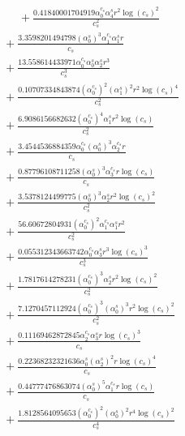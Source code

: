 \documentclass[10pt]{article}
\begin{document}
\begin{align*}
\phantom{R_{0,8}} &\phantom{={}}{}  + \frac{0.41840001704919 \alpha_{0}^{c_s} \alpha_{4}^s r^{2} \log{\left(c_{s} \right)}^{2}}{c_{s}^{2}} \\
&{}  + \frac{3.3598201494798 \left(\alpha_{0}^s\right)^{3} \alpha_{1}^{c_s} \alpha_{1}^s r}{c_{s}} \\
&{}  + \frac{13.558614433971 \alpha_{0}^{c_s} \alpha_{0}^s \alpha_{2}^s r^{3}}{c_{s}^{3}} \\
&{}  + \frac{0.10707334843874 \left(\alpha_{0}^{c_s}\right)^{2} \left(\alpha_{1}^s\right)^{2} r^{2} \log{\left(c_{s} \right)}^{4}}{c_{s}^{2}} \\
&{}  + \frac{6.9086156682632 \left(\alpha_{0}^{c_s}\right)^{4} \alpha_{1}^s r^{2} \log{\left(c_{s} \right)}}{c_{s}^{2}} \\
&{}  + \frac{3.4544536884359 \alpha_{0}^{c_s} \left(\alpha_{0}^s\right)^{3} \alpha_{2}^{c_s} r}{c_{s}} \\
&{}  + \frac{0.87796108711258 \left(\alpha_{0}^s\right)^{3} \alpha_{3}^{c_s} r \log{\left(c_{s} \right)}}{c_{s}} \\
&{}  + \frac{3.5378124499775 \left(\alpha_{0}^s\right)^{3} \alpha_{2}^s r^{2} \log{\left(c_{s} \right)}^{2}}{c_{s}^{2}} \\
&{}  + \frac{56.60672804931 \left(\alpha_{0}^{c_s}\right)^{2} \alpha_{1}^{c_s} \alpha_{1}^s r^{2}}{c_{s}^{2}} \\
&{}  + \frac{0.055312343663742 \alpha_{0}^{c_s} \alpha_{3}^s r^{3} \log{\left(c_{s} \right)}^{3}}{c_{s}^{3}} \\
&{}  + \frac{1.7817614278231 \left(\alpha_{0}^{c_s}\right)^{3} \alpha_{2}^s r^{2} \log{\left(c_{s} \right)}^{2}}{c_{s}^{2}} \\
&{}  + \frac{7.1270457112924 \left(\alpha_{0}^{c_s}\right)^{3} \left(\alpha_{0}^s\right)^{3} r^{2} \log{\left(c_{s} \right)}^{2}}{c_{s}^{2}} \\
&{}  + \frac{0.11169462872845 \alpha_{2}^{c_s} \alpha_{3}^s r \log{\left(c_{s} \right)}^{3}}{c_{s}} \\
&{}  + \frac{0.22368232321636 \alpha_{0}^s \left(\alpha_{2}^s\right)^{2} r \log{\left(c_{s} \right)}^{4}}{c_{s}} \\
&{}  + \frac{0.44777476863074 \left(\alpha_{0}^s\right)^{5} \alpha_{1}^{c_s} r \log{\left(c_{s} \right)}}{c_{s}} \\
&{}  + \frac{1.8128564095653 \left(\alpha_{0}^{c_s}\right)^{2} \left(\alpha_{0}^s\right)^{2} r^{4} \log{\left(c_{s} \right)}^{2}}{c_{s}^{4}} \\

\end{align*}
\end{document}
